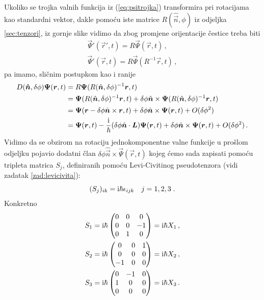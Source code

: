 Ukoliko se trojka valnih funkcija iz (\ref{eq:psitrojka}) transformira
pri rotacijama kao standardni vektor, dakle pomoću iste matrice $R(\hat{\vec{n}}, \phi)$
iz odjeljka \ref{sec:tenzori}, iz gornje slike vidimo da zbog promjene
orijentacije čestice treba biti
\begin{gather*}
\vec{\Psi}'(\vec{r}',t)=R \vec{\Psi}(\vec{r},t) \,, \\
\vec{\Psi}'(\vec{r},t)=R \vec{\Psi}(R^{-1}\vec{r},t) \,, 
\end{gather*}
pa imamo, sličnim postupkom kao i ranije
\begin{equation*}
\begin{split}
D(\vec{\hat{n}},\delta\phi)\vec{\Psi}(\vec{r}, t)&=
 R \vec{\Psi}(R(\hat{\vec{n}},\delta \phi)^{-1}
\vec{r}, t) \\
 &=\vec{\Psi}(R(\hat{\vec{n}}, \delta\phi)^{-1}\vec{r}, t)+
\delta\phi \hat{\vec{n}}\times\vec{\Psi}(
R(\hat{\vec{n}}, \delta\phi)^{-1}\vec{r},t) \\
 &=\vec{\Psi}(\vec{r}-\delta\phi\hat{\vec{n}}\times\vec{r}, t)+
\delta\phi \hat{\vec{n}}\times\vec{\Psi}(\vec{r},t) + O(\delta\phi^2) \\
 &= \vec{\Psi}(\vec{r}, t)-\frac{\rmi}{\hbar}(\delta\phi\hat{\vec{n}}\cdot
  \vec{L})\vec{\Psi}(\vec{r}, t)+
\delta\phi \hat{\vec{n}}\times\vec{\Psi}(\vec{r},t) + O(\delta\phi^2) \,.
\end{split}
\end{equation*}
Vidimo da se obzirom na rotaciju jednokomponentne valne funkcije u prošlom
odjeljku pojavio dodatni član $\delta\phi \hat{\vec{n}}\times\vec{\Psi}(\vec{r},t)$
kojeg ćemo sada zapisati pomoću tripleta matrica $S_{j}$,
definiranih pomoću Levi-Civitinog pseudotenzora (vidi zadatak \ref{zad:levicivita}):
\begin{equation}
(S_j)_{ik} = \textrm{i}\hbar\epsilon_{ijk} \quad j=1,2,3 \;.
\end{equation}
Konkretno
\begin{align}
S_1& =\textrm{i}\hbar
\begin{pmatrix}
0 & 0 & 0 \\
0 & 0 &-1 \\
0 & 1 & 0
\end{pmatrix} = \textrm{i}\hbar X_1 \,,\\
S_2& = \textrm{i}\hbar
\begin{pmatrix}
0 & 0 & 1 \\
0 & 0 & 0 \\
-1 & 0 & 0
\end{pmatrix} = \textrm{i}\hbar X_2 \,, \\
S_3& = \textrm{i}\hbar
\begin{pmatrix}
0 & -1 & 0 \\
1 & 0 & 0\\
0 & 0 & 0
\end{pmatrix} = \textrm{i}\hbar X_3 \,.
\end{align}
